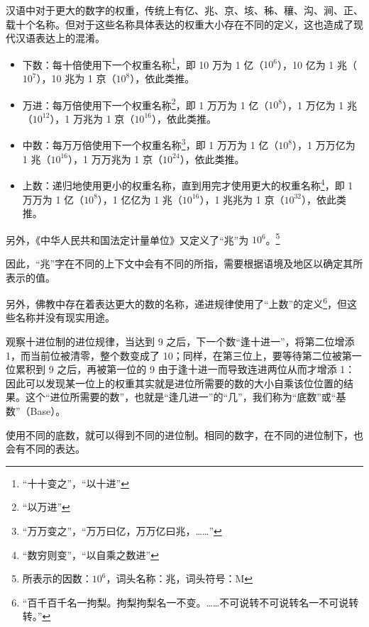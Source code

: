         \begin{displayquote}
            汉语中对于更大的数字的权重，传统上有亿、兆、京、垓、秭、穰、沟、涧、正、载十个名称。但对于这些名称具体表达的权重大小存在不同的定义，这也造成了现代汉语表达上的混淆。

            \begin{itemize}
                \item 下数：每十倍使用下一个权重名称\footnote{“十十变之”\cite[卷上 12]{wujin}，“以十进”\cite[卷一 15]{shulijinyun}}，即 10 万为 1 亿（$10^6$），10 亿为 1 兆（$10^7$），10 兆为 1 京（$10^8$），依此类推。
                \item 万进：每万倍使用下一个权重名称\footnote{“以万进”\cite[卷一 15]{shulijinyun}}，即 1 万万为 1 亿（$10^8$），1 万亿为 1 兆（$10^{12}$），1 万兆为 1 京（$10^{16}$），依此类推。
                \item 中数：每万万倍使用下一个权重名称\footnote{“万万变之”\cite[卷上 12]{wujin}，“万万曰亿，万万亿曰兆，……”\cite[卷上 3]{sunzi}}，即 1 万万为 1 亿（$10^8$），1 万万亿为 1 兆（$10^{16}$），1 万万兆为 1 京（$10^{24}$），依此类推。
                \item 上数：递归地使用更小的权重名称，直到用完才使用更大的权重名称\footnote{“数穷则变”\cite[卷上 12]{wujin}，“以自乘之数进”\cite[卷上 15]{shulijinyun}}，即 1 万万为 1 亿（$10^8$），1 亿亿为 1 兆（$10^{16}$），1 兆兆为 1 京（$10^{32}$），依此类推。
            \end{itemize}
            另外，《中华人民共和国法定计量单位》又定义了“兆”为 $10^6$。\footnote{所表示的因数：$10^6$，词头名称：兆，词头符号：M\cite[附件 表 5]{gf1984-28}}

            因此，“兆”字在不同的上下文中会有不同的所指，需要根据语境及地区以确定其所表示的值。

            另外，佛教中存在着表达更大的数的名称，递进规律使用了“上数”的定义\footnote{“百千百千名一拘梨。拘梨拘梨名一不变。……不可说转不可说转名一不可说转转。”\cite[卷第二十九 1]{huayan}}，但这些名称并没有现实用途。
        \end{displayquote}

        观察十进位制的进位规律，当达到 9 之后，下一个数“逢十进一”，将第二位增添 1，而当前位被清零，整个数变成了 10；同样，在第三位上，要等待第二位被第一位累积到 9 之后，再被第一位的 9 由于逢十进一而导致连进两位从而才增添 1：因此可以发现某一位上的权重其实就是进位所需要的数的大小自乘该位位置的结果。这个“进位所需要的数”，也就是“逢几进一”的“几”，我们称为“底数”或“基数”（Base）。

        使用不同的底数，就可以得到不同的进位制。相同的数字，在不同的进位制下，也会有不同的表达。
